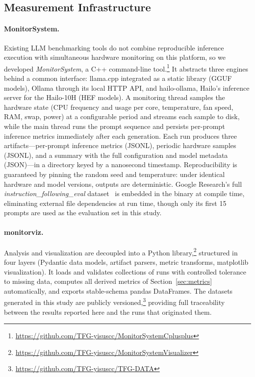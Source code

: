\documentclass[acmsmall,natbib=false]{acmart}
\begin{document}
\subsection{Measurement Infrastructure}\label{sec:infrastructure}

\paragraph{MonitorSystem.}
Existing LLM benchmarking tools do not combine reproducible inference
execution with simultaneous hardware monitoring on this platform, so we
developed \textit{MonitorSystem}, a C++ command-line
tool.\footnote{\url{https://github.com/TFG-yisuscc/MonitorSystemCplusplus}}
It abstracts three engines behind a common interface: llama.cpp integrated as
a static library (GGUF models), Ollama through its local HTTP API, and
hailo-ollama, Hailo's inference server for the Hailo-10H (HEF models). A
monitoring thread samples the hardware state (CPU frequency and usage per
core, temperature, fan speed, RAM, swap, power) at a configurable period and
streams each sample to disk, while the main thread runs the prompt sequence
and persists per-prompt inference metrics immediately after each generation.
Each run produces three artifacts---per-prompt inference metrics (JSONL),
periodic hardware samples (JSONL), and a summary with the full configuration
and model metadata (JSON)---in a directory keyed by a nanosecond timestamp.
Reproducibility is guaranteed by pinning the random seed and temperature:
under identical hardware and model versions, outputs are deterministic.
Google Research's full \textit{instruction\_following\_eval}
dataset~\cite{zhou_instruction-following_2023} is embedded in the binary at
compile time, eliminating external file dependencies at run time, though
only its first 15 prompts are used as the evaluation set in this study.

\paragraph{monitorviz.}
Analysis and visualization are decoupled into a Python
library,\footnote{\url{https://github.com/TFG-yisuscc/MonitorSystemVisualizer}}
structured in four layers (Pydantic data models, artifact parsers, metric
transforms, matplotlib visualization). It loads and validates collections of
runs with controlled tolerance to missing data, computes all derived metrics
of Section~\ref{sec:metrics} automatically, and exports stable-schema pandas
DataFrames. The datasets generated in this study are publicly
versioned,\footnote{\url{https://github.com/TFG-yisuscc/TFG-DATA}} providing
full traceability between the results reported here and the runs that
originated them.
\end{document}
